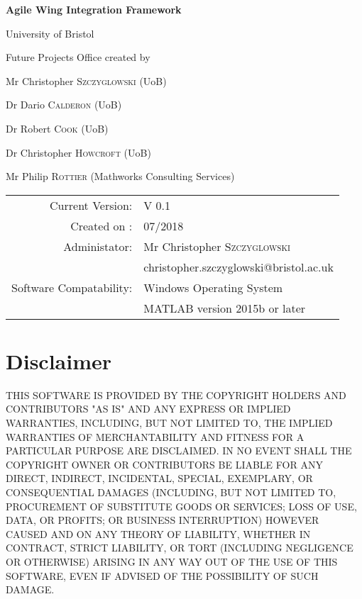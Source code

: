 \documentclass[10pt,a4paper]{article}
\begin{document}
\begin{titlepage}
\centering

\vspace*{4cm}
{\huge\bfseries Agile Wing Integration Framework\par}

\vspace{1.5cm}
{\LARGE University of Bristol}

\vspace{0.5cm}
{\LARGE Future Projects Office}
\vfill
created by\par
Mr Christopher \textsc{Szczyglowski} (UoB)

Dr Dario \textsc{Calderon} (UoB)

Dr Robert \textsc{Cook} (UoB)

Dr Christopher \textsc{Howcroft} (UoB)

Mr Philip \textsc{Rottier} (Mathworks Consulting Services)

\vspace{3cm}
\begin{tabular}{rl}
Current Version: & V 0.1 \\
Created on : & 07/2018 \\
Administator: & Mr Christopher \textsc{Szczyglowski} \\
 & christopher.szczyglowski@bristol.ac.uk \\
Software Compatability: & Windows Operating System \\
& MATLAB version 2015b or later
\end{tabular}


\end{titlepage}

\section*{Disclaimer}
THIS SOFTWARE IS PROVIDED BY THE COPYRIGHT HOLDERS AND CONTRIBUTORS "AS IS" AND ANY EXPRESS OR IMPLIED WARRANTIES, INCLUDING, BUT NOT LIMITED TO, THE IMPLIED WARRANTIES OF MERCHANTABILITY AND FITNESS FOR A PARTICULAR PURPOSE ARE DISCLAIMED. IN NO EVENT SHALL THE COPYRIGHT OWNER OR CONTRIBUTORS BE LIABLE FOR ANY DIRECT, INDIRECT, INCIDENTAL, SPECIAL, EXEMPLARY, OR CONSEQUENTIAL DAMAGES (INCLUDING, BUT NOT LIMITED TO, PROCUREMENT OF SUBSTITUTE GOODS OR SERVICES; LOSS OF USE, DATA, OR PROFITS; OR BUSINESS INTERRUPTION) HOWEVER CAUSED AND ON ANY THEORY OF LIABILITY, WHETHER IN CONTRACT, STRICT LIABILITY, OR TORT (INCLUDING NEGLIGENCE OR OTHERWISE) ARISING IN ANY WAY OUT OF THE USE OF THIS SOFTWARE, EVEN IF ADVISED OF THE POSSIBILITY OF SUCH DAMAGE.
\end{document}

